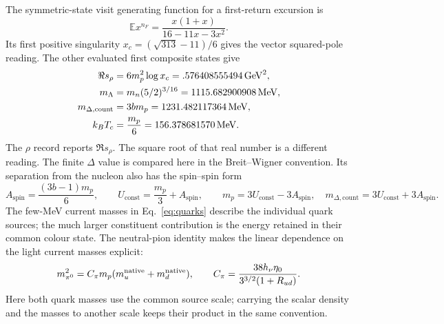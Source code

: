 \documentclass[aps,prx,onecolumn,10pt,notitlepage,nofootinbib,longbibliography]{revtex4-2}
\numberwithin{equation}{section}
\numberwithin{table}{section}
\newcommand{\EE}{\mathbb E}
\newcommand{\MeV}{\,\mathrm{MeV}}
\newcommand{\hover}{h_\nu}
\begin{document}
The symmetric-state visit generating function for a first-return excursion is
\begin{equation}
 \EE x^{n_F}=\frac{x(1+x)}{16-11x-3x^2}.
\end{equation}
Its first positive singularity $x_c=(\sqrt{313}-11)/6$ gives the vector squared-pole reading. The other evaluated first composite states give
\begin{align}
 \Re s_\rho&=6m_p^2\log x_c=.576408555494\,\mathrm{GeV}^2,\notag\\
 m_\Lambda&=m_n(5/2)^{3/16}=1115.682900908\MeV,\notag\\
 m_{\Delta,\mathrm{count}}&=3bm_p=1231.482117364\MeV,\notag\\
 k_BT_c&=\frac{m_p}{6}=156.378681570\MeV.
\end{align}
The $\rho$ record reports $\Re s_\rho$. The square root of that real number is a different reading. The finite $\Delta$ value is compared here in the Breit--Wigner convention. Its separation from the nucleon also has the spin--spin form
\begin{equation}
 A_{\mathrm{spin}}=\frac{(3b-1)m_p}{6},\qquad
 U_{\mathrm{const}}=\frac{m_p}{3}+A_{\mathrm{spin}},\qquad
 m_p=3U_{\mathrm{const}}-3A_{\mathrm{spin}},\quad
 m_{\Delta,\mathrm{count}}=3U_{\mathrm{const}}+3A_{\mathrm{spin}}.
 \label{eq:spinmass}
\end{equation}
The few-MeV current masses in Eq.~\eqref{eq:quarks} describe the individual quark sources; the much larger constituent contribution is the energy retained in their common colour state. The neutral-pion identity makes the linear dependence on the light current masses explicit:
\begin{equation}
 m_{\pi^0}^2=C_\pi m_p(m_u^{\rm native}+m_d^{\rm native}),\qquad
 C_\pi=\frac{38\hover\eta_0}{3^{3/2}(1+R_{ud})}.
 \label{eq:chiralidentity}
\end{equation}
Here both quark masses use the common source scale; carrying the scalar density and the masses to another scale keeps their product in the same convention.
\end{document}
